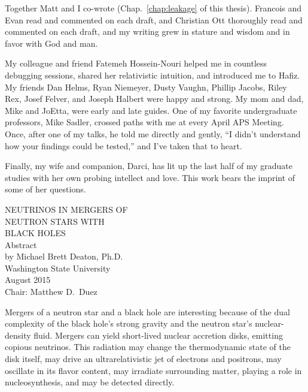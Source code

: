 \documentclass[12pt]{report}
\begin{document}
  Together Matt and I co-wrote \citealt{deat2013-leakage}
  (Chap.~\ref{chap:leakage} of this thesis).
  Francois and Evan read and commented on each draft, and Christian Ott
  thoroughly read and commented on each draft,
  and my writing grew in stature and wisdom and in favor with God and man.

  My colleague and friend Fatemeh Hossein-Nouri helped me in countless debugging
  sessions, shared her relativistic intuition, and introduced me to Hafiz.
  My friends Dan Helms, Ryan Niemeyer, Dusty Vaughn, Phillip Jacobs, Riley
  Rex, Josef Felver, and Joseph Halbert were happy and strong.
  My mom and dad, Mike and JoEtta, were early and late guides.
  One of my favorite undergraduate professors, Mike Sadler, crossed paths with me
  at every April APS Meeting. Once, after one of my talks,
  he told me directly and gently, ``I didn't understand how your findings could
  be tested,'' and I've taken that to heart.

  Finally, my wife and companion, Darci, has lit up the last half of my graduate
  studies with her own probing intellect and love. This work bears the imprint
  of some of her questions.

\newpage

\begin{center}
  \begin{singlespace}
    \label{ssec:abstract}

    {\uppercase{
        Neutrinos in Mergers of\\
        Neutron Stars with\\
        Black Holes}}\\
    \bigskip
    Abstract\\
    \bigskip \bigskip \bigskip
    by Michael Brett Deaton, Ph.D.\\
    Washington State University\\
    August 2015\\
    \bigskip \bigskip \bigskip
    Chair: Matthew D.\ Duez
  \end{singlespace}
\end{center}
  
Mergers of a neutron star and a black hole are interesting because of the dual
complexity of the black hole's strong gravity and the neutron star's
nuclear-density fluid.
Mergers can yield short-lived nuclear accretion disks, emitting copious neutrinos.
This radiation
may change the thermodynamic state of the disk itself,
may drive an ultrarelativistic jet of electrons and positrons,
may oscillate in its flavor content,
may irradiate surrounding matter, playing a role in nucleosynthesis,
and may be detected directly.
\end{document}
